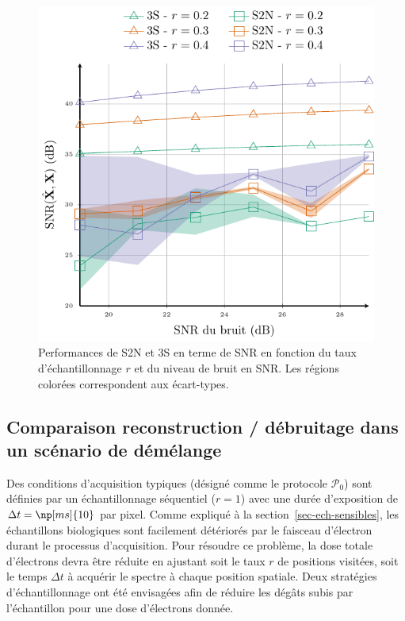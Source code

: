 \begin{figure}[h!]
    \centering
    \includegraphics{img/chapitre3/figure6/pix_ratio.pdf}
    \caption{Performances de S2N et 3S en terme de SNR en fonction du taux d'échantillonnage $r$ et du niveau de bruit en SNR. Les régions colorées correspondent aux écart-types. 
        \protect\label{fig-s2n-3s-noise-ratio}}
\end{figure}

\subsection{Comparaison reconstruction / débruitage dans un scénario de démélange}\label{sec-lr-demelange-res}

Des conditions d'acquisition typiques (désigné comme le protocole $\mathcal{P}_0$) sont définies par un échantillonnage séquentiel ($r=1$) avec une durée d'exposition de $\Delta t = \np[ms]{10}$ par pixel. Comme expliqué à la section~\ref{sec-ech-sensibles}, les échantillons biologiques sont facilement détériorés par le faisceau d'électron durant le processus d'acquisition.  Pour résoudre ce problème, la dose totale d'électrons devra être réduite en ajustant soit le taux $r$ de positions visitées, soit le temps $\Delta t$ à acquérir le spectre à chaque position spatiale.
Deux stratégies d'échantillonnage ont été envisagées afin de réduire les dégâts subis par l'échantillon pour une dose d'électrons donnée.

